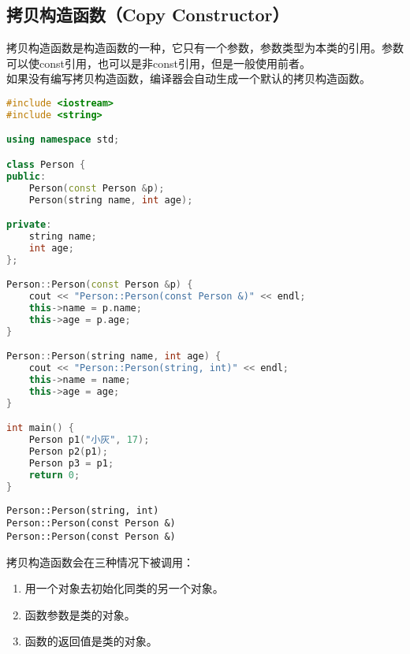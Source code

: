 \vspace{0.5cm}

\subsection{拷贝构造函数（Copy Constructor）}

拷贝构造函数是构造函数的一种，它只有一个参数，参数类型为本类的引用。参数可以使const引用，也可以是非const引用，但是一般使用前者。\\

如果没有编写拷贝构造函数，编译器会自动生成一个默认的拷贝构造函数。\\


\begin{lstlisting}[language=C++]
#include <iostream>
#include <string>

using namespace std;

class Person {
public:
    Person(const Person &p);
    Person(string name, int age);

private:
    string name;
    int age;
};

Person::Person(const Person &p) {
    cout << "Person::Person(const Person &)" << endl;
    this->name = p.name;
    this->age = p.age;
}

Person::Person(string name, int age) {
    cout << "Person::Person(string, int)" << endl;
    this->name = name;
    this->age = age;
}

int main() {
    Person p1("小灰", 17);
    Person p2(p1);
    Person p3 = p1;
    return 0;
}
\end{lstlisting}

\begin{tcolorbox}
	\begin{verbatim}
Person::Person(string, int)
Person::Person(const Person &)
Person::Person(const Person &)
	\end{verbatim}
\end{tcolorbox}

拷贝构造函数会在三种情况下被调用：

\begin{enumerate}
	\item 用一个对象去初始化同类的另一个对象。
	\item 函数参数是类的对象。
	\item 函数的返回值是类的对象。
\end{enumerate}

\vspace{0.5cm}

